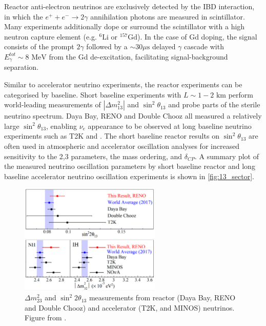 Reactor anti-electron neutrinos are exclusively detected by the IBD interaction, in which the $e^+ + e^- \rightarrow 2\gamma$ annihilation photons are measured in scintillator. Many experiments additionally dope or surround the scintillator with a high neutron capture element (e.g. $^{6}\text{Li}$ or $^{157}\text{Gd}$). In the case of Gd doping, the signal consists of the prompt $2\gamma$ followed by a $\sim30\mu\text{s}$ delayed $\gamma$ cascade with $E_\gamma^{tot}\sim8\text{ MeV}$ from the Gd de-excitation, facilitating signal-background separation\cite{daya_bay,reno}.

Similar to accelerator neutrino experiments, the reactor experiments can be categorised by baseline. Short baseline experiments with $L\sim1-2\text{ km}$ perform world-leading measurements of $|\Delta m^2_{13}|$ and $\sin^2\theta_{13}$ and probe parts of the sterile neutrino spectrum. Daya Bay\cite{daya_bay_disc}, RENO\cite{reno_disc} and Double Chooz\cite{double_chooz} all measured a relatively large $\sin^2 \theta_{13}$, enabling $\nu_e$ appearance to be observed at long baseline neutrino experiments such as T2K and \nova. The short baseline reactor results on $\sin^2\theta_{13}$ are often used in atmospheric and accelerator oscillation analyses for increased sensitivity to the 2,3 parameters, the mass ordering, and $\delta_{CP}$. A summary plot of the measured neutrino oscillation parameters by short baseline reactor and long baseline accelerator neutrino oscillation experiments is shown in \autoref{fig:13_sector}.
\begin{figure}[h]
	\includegraphics[width=0.6\textwidth, trim={0mm 0mm 0mm 0mm}, clip,page=1]{figures/theory/reno_theta_dm13}
	\caption{$\Delta m^2_{23}$ and $\sin^2 2\theta_{13}$ measurements from reactor (Daya Bay\cite{daya_bay}, RENO\cite{reno_new} and Double Chooz\cite{double_chooz_old}) and accelerator (T2K\cite{t2k_2015}, \nova\cite{nova_2017} and MINOS\cite{minos_numu_nue}) neutrinos. Figure from \cite{reno_new}.}
	\label{fig:13_sector}
\end{figure}

